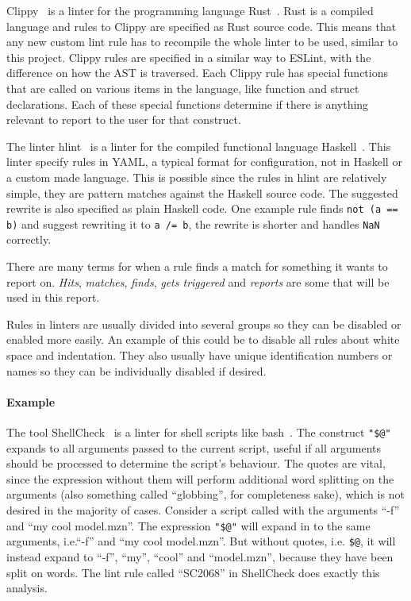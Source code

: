\documentclass[a4paper,12pt]{article}
\begin{document}
Clippy~\cite{Clippy} is a linter for the programming language Rust~\cite{rustlang}. Rust
is a compiled language and rules to Clippy are specified as Rust source code. This means
that any new custom lint rule has to recompile the whole linter to be used, similar to
this project. Clippy rules are specified in a similar way to ESLint, with the difference
on how the AST is traversed. Each Clippy rule has special functions that are called on
various items in the language, like function and struct declarations. Each of these
special functions determine if there is anything relevant to report to the user for that
construct.

The linter hlint~\cite{hlint} is a linter for the compiled functional language
Haskell~\cite{haskell}. This linter specify rules in YAML, a typical format for
configuration, not in Haskell or a custom made language. This is possible since
the rules in hlint are relatively simple, they are pattern matches against the Haskell source code.
The suggested rewrite is also specified as plain Haskell code. One example rule finds \texttt{not (a == b)}
and suggest rewriting it to \texttt{a /= b}, the rewrite is shorter and handles \texttt{NaN} correctly.

There are many terms for when a rule finds a match for something it wants to report on.
\emph{Hits}, \emph{matches}, \emph{finds}, \emph{gets triggered} and \emph{reports} are
some that will be used in this report.

Rules in linters are usually divided into several groups so they can be disabled or
enabled more easily. An example of this could be to disable all rules about white space
and indentation. They also usually have unique identification numbers or names so they can
be individually disabled if desired.

\paragraph{Example}
The tool ShellCheck~\cite{shellcheck} is a linter for shell scripts like
bash~\cite{bash}. The construct \texttt{"\$@"} expands to all arguments passed to the
current script, useful if all arguments should be processed to determine the script's
behaviour. The quotes are vital, since the expression without them will perform additional
word splitting on the arguments (also something called ``globbing'', for completeness
sake), which is not desired in the majority of cases. Consider a script called with the
arguments ``-f'' and ``my cool model.mzn''. The expression \texttt{"\$@"} will expand in
to the same arguments, i.e.\@ ``-f'' and ``my cool model.mzn''. But without quotes, i.e.\@
\texttt{\$@}, it will instead expand to ``-f'', ``my'', ``cool'' and ``model.mzn'', because they
have been split on words. The lint
rule called ``SC2068'' in ShellCheck does exactly this analysis.
\end{document}
